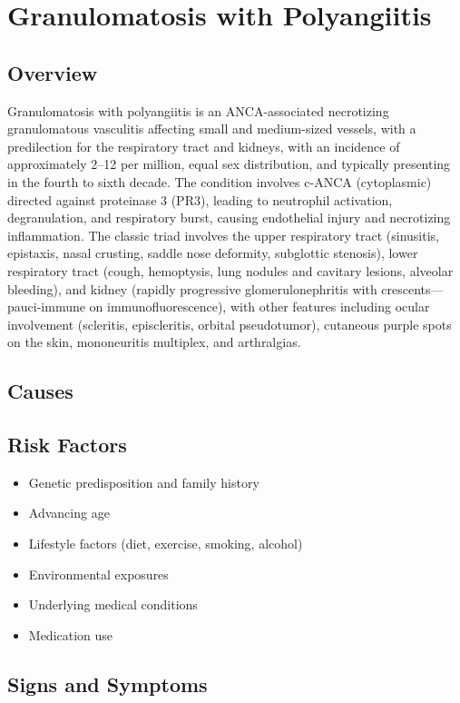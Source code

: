 \chapter{Granulomatosis with Polyangiitis}
\label{sec:Granulomatosis with Polyangiitis (GPA)}

\section{Overview}
Granulomatosis with polyangiitis is an ANCA-associated necrotizing granulomatous vasculitis affecting small and medium-sized vessels, with a predilection for the respiratory tract and kidneys, with an incidence of approximately 2--12 per million, equal sex distribution, and typically presenting in the fourth to sixth decade. The condition involves c-ANCA (cytoplasmic) directed against proteinase 3 (PR3), leading to neutrophil activation, degranulation, and respiratory burst, causing endothelial injury and necrotizing inflammation. The classic triad involves the upper respiratory tract (sinusitis, epistaxis, nasal crusting, saddle nose deformity, subglottic stenosis), lower respiratory tract (cough, hemoptysis, lung nodules and cavitary lesions, alveolar bleeding), and kidney (rapidly progressive glomerulonephritis with crescents---pauci-immune on immunofluorescence), with other features including ocular involvement (scleritis, episcleritis, orbital pseudotumor), cutaneous purple spots on the skin, mononeuritis multiplex, and arthralgias.
\section{Causes}
\section{Risk Factors}

\begin{itemize}[noitemsep]
  \item Genetic predisposition and family history
  \item Advancing age
  \item Lifestyle factors (diet, exercise, smoking, alcohol)
  \item Environmental exposures
  \item Underlying medical conditions
  \item Medication use
\end{itemize}
\section{Signs and Symptoms}

